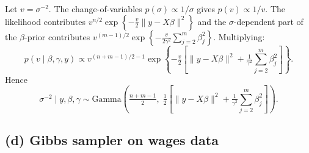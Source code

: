 \documentclass[
  letterpaper,
  DIV=11,
  numbers=noendperiod]{scrartcl}
\begin{document}
Let \(v = \sigma^{-2}\). The change-of-variables
\(p(\sigma) \propto 1/\sigma\) gives \(p(v) \propto 1/v\). The
likelihood contributes
\(v^{n/2}\exp\!\left\{-\tfrac{v}{2}\|y-X\beta\|^2\right\}\) and the
\(\sigma\)-dependent part of the \(\beta\)-prior contributes
\(v^{(m-1)/2}\exp\!\left\{-\tfrac{v}{2\gamma^2}\sum_{j=2}^m \beta_j^2\right\}\).
Multiplying: \[
p(v \mid \beta, \gamma, y) \propto v^{(n+m-1)/2 - 1} \exp\!\left\{-\tfrac{v}{2}\left[\|y - X\beta\|^2 + \tfrac{1}{\gamma^2}\sum_{j=2}^m \beta_j^2\right]\right\}.
\] Hence \[
\boxed{\sigma^{-2} \mid y, \beta, \gamma \sim \text{Gamma}\!\left(\tfrac{n+m-1}{2},\; \tfrac{1}{2}\left[\|y - X\beta\|^2 + \tfrac{1}{\gamma^2}\sum_{j=2}^m \beta_j^2\right]\right).}
\]

\subsection{(d) Gibbs sampler on wages
data}\label{d-gibbs-sampler-on-wages-data}
\end{document}
